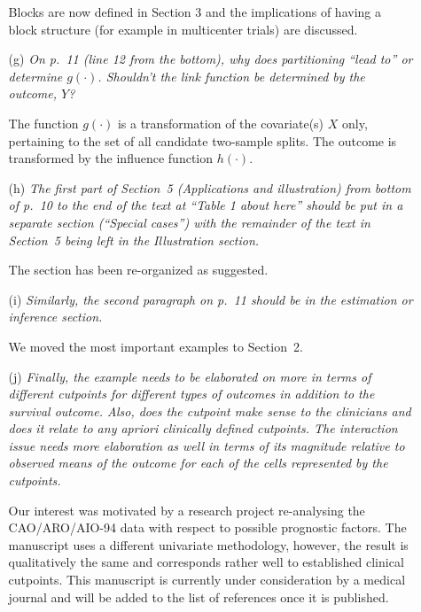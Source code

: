\documentclass[11pt,a4paper]{article}
\begin{document}
\begin{enumerate}
\begin{itemize}
	       Blocks are now defined in Section 3 and the implications
               of having a block structure (for example in multicenter trials) 
               are discussed.
               
	       
    \item[(g)] \textit{On p.~11 (line 12 from the bottom), why does partitioning 
               ``lead to'' or determine $g(\cdot)$. Shouldn't the link function be
	       determined by the outcome, $Y$?}
	       
	       The function $g(\cdot)$ is a transformation of the covariate(s) $X$
	       only, pertaining to the set of all candidate two-sample splits.
	       The outcome is transformed by the influence function $h(\cdot)$.
	       
    \item[(h)] \textit{The first part of Section~5 (Applications and illustration)
               from bottom of p.~10 to the end of the text at ``Table 1 about here''
	       should be put in a separate section (``Special cases'') with the
	       remainder of the text in Section~5 being left in the Illustration
	       section.}
	       
	       The section has been re-organized as suggested.
	       
    \item[(i)] \textit{Similarly, the second paragraph on p.~11 should be in the
               estimation or inference section.}
	       
	       We moved the most important examples to Section~2.
	       
    \item[(j)] \textit{Finally, the example needs to be elaborated on more in terms
               of different cutpoints for different types of outcomes in addition to
	       the survival outcome. Also, does the cutpoint make sense to the
	       clinicians and does it relate to any apriori clinically defined
	       cutpoints. The interaction issue needs more elaboration as well in
	       terms of its magnitude relative to observed means of the outcome for
	       each of the cells represented by the cutpoints.}
	       
Our interest was motivated by a research project re-analysing the CAO/ARO/AIO-94
data with respect to possible prognostic factors. The manuscript uses 
a different univariate methodology, however, the result is qualitatively the same
and corresponds rather well to established clinical cutpoints. 
This manuscript is currently under consideration by a medical journal and will
be added to the list of references once it is published.

\end{itemize}
  
\end{enumerate}
\end{document}
